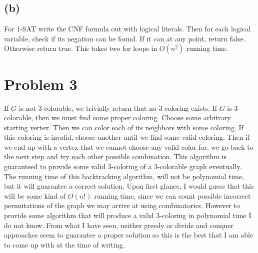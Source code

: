 \documentclass{article}
\theoremstyle{definition}
\begin{document}
\subsection*{(b)}
    For 1-SAT write the CNF formula out with logical literals. Then for each logical variable, check if 
    its negation can be found. If it can at any point, return false. Otherwise return true. This takes two 
    for loops in $O(n^2)$ running time.

\section*{Problem 3}
    If $G$ is not  3-colorable, we trivially return that no 3-coloring exists. If $G$ is 
    3-colorable, then we must find some proper coloring. Choose some arbitrary starting 
    vertex. Then we can color each of its neighbors with some coloring. If this coloring is invalid, choose
    another until we find some valid coloring. Then if we end up with a vertex that we cannot choose any valid 
    color for, we go back to the next step and try each other possible combination. This algorithm is 
    guaranteed to provide some valid 3-coloring of a 3-colorable graph eventually. The running time of this backtracking algorithm,
    will not be polynomial time, but it will guarantee a correct solution. Upon first glance, I would guess that this will be some kind of
    $O(n!)$ running time, since we can count possible incorrect permutations of the graph we may arrive at using combinatorics. However to
    provide some algorithm that will produce a valid 3-coloring in polynomial time I do not know.
    From what I have seen, neither greedy or divide and conquer approaches seem to guarantee a proper solution so 
    this is the best that I am able to come up with at the time of writing.
\end{document}
